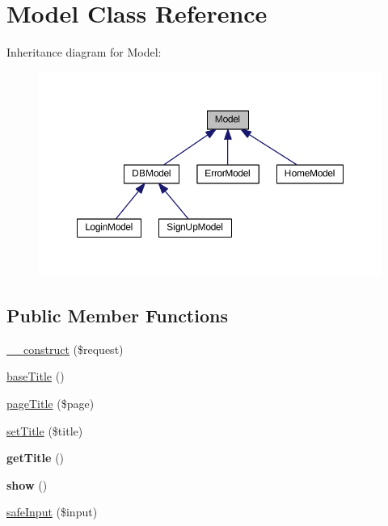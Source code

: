 \hypertarget{classModel}{\section{Model Class Reference}
\label{classModel}
}


Inheritance diagram for Model\+:\nopagebreak
\begin{figure}[H]
\begin{center}
\leavevmode
\includegraphics[width=350pt]{classModel__inherit__graph}
\end{center}
\end{figure}
\subsection*{Public Member Functions}
\begin{DoxyCompactItemize}
\item 
\hyperlink{classModel_a6cdf6d42c65dfc104d7ff60d23550b50}{\+\_\+\+\_\+construct} (\$request)
\item 
\hyperlink{classModel_abd27409e82e2413a8083c22fe73740b9}{base\+Title} ()
\item 
\hyperlink{classModel_a729bceb5699b258da651b948433c0543}{page\+Title} (\$page)
\item 
\hyperlink{classModel_a618dc24391e96f5dabb021f7a91f310c}{set\+Title} (\$title)
\item 
\hypertarget{classModel_a76514c143747205243903e09facf6383}{{\bfseries get\+Title} ()}\label{classModel_a76514c143747205243903e09facf6383}

\item 
\hypertarget{classModel_a0f7d2666269cc8b1b1072c6cbb6ac9e4}{{\bfseries show} ()}\label{classModel_a0f7d2666269cc8b1b1072c6cbb6ac9e4}

\item 
\hyperlink{classModel_a55ed5897d135030216ef6e68a83c9cce}{safe\+Input} (\$input)
\end{DoxyCompactItemize}
